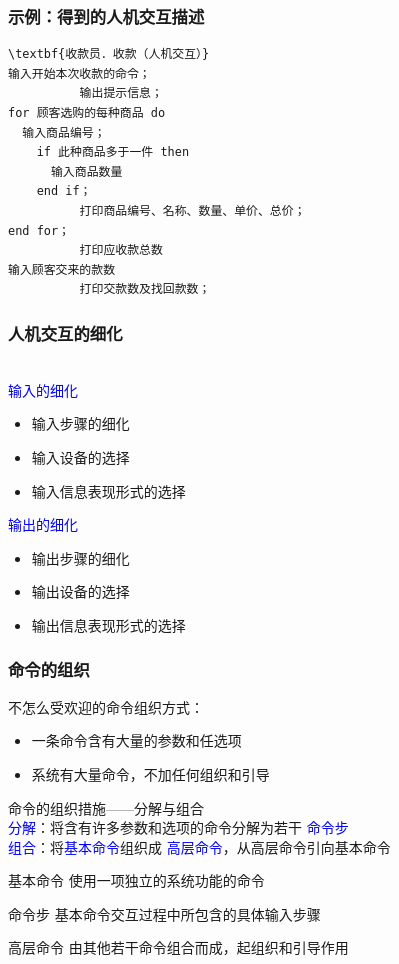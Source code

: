 \documentclass[compress]{beamer}
\begin{document}
\begin{frame}[fragile]
  \frametitle{示例：得到的人机交互描述}
\renewcommand\baselinestretch{1.2}
\begin{Verbatim}[commandchars=\\\{\}, label=收款.人机交互]
\textbf{收款员．收款（人机交互）}
输入开始本次收款的命令；
          输出提示信息；
for 顾客选购的每种商品 do
  输入商品编号；
    if 此种商品多于一件 then
      输入商品数量
    end if；
          打印商品编号、名称、数量、单价、总价；
end for；
          打印应收款总数
输入顾客交来的款数
          打印交款数及找回款数；
\end{Verbatim}
\end{frame}

\begin{frame}
  \frametitle{人机交互的细化}
  \noindent{}\\[1ex]
  \textcolor{blue}{输入的细化}
  \begin{itemize}
    \item 输入步骤的细化
    \item 输入设备的选择
    \item 输入信息表现形式的选择
  \end{itemize}

  \textcolor{blue}{输出的细化}
  \begin{itemize}
    \item 输出步骤的细化
    \item 输出设备的选择
    \item 输出信息表现形式的选择
  \end{itemize}
\end{frame}

\begin{frame}
  \frametitle{命令的组织}
   {
  \noindent\alert{不怎么受欢迎}的命令组织方式：
  \begin{itemize}
    \item 一条命令含有大量的参数和任选项
    \item 系统有大量命令，不加任何组织和引导
  \end{itemize}

  \noindent 命令的组织措施——分解与组合 \\
  \textcolor{blue}{分解}：将含有许多参数和选项的命令分解为若干
  \textcolor{blue}{命令步} \\
  \textcolor{blue}{组合}：将\textcolor{blue}{基本命令}组织成
  \textcolor{blue}{高层命令}，从高层命令引向基本命令
  }

   {
    \begin{block}{基本命令}
      使用一项独立的系统功能的命令
    \end{block}
    \begin{block}{命令步}    
      基本命令交互过程中所包含的具体输入步骤
    \end{block}
    \begin{block}{高层命令}
      由其他若干命令组合而成，起组织和引导作用
    \end{block}
  }
\end{frame}
\end{document}
